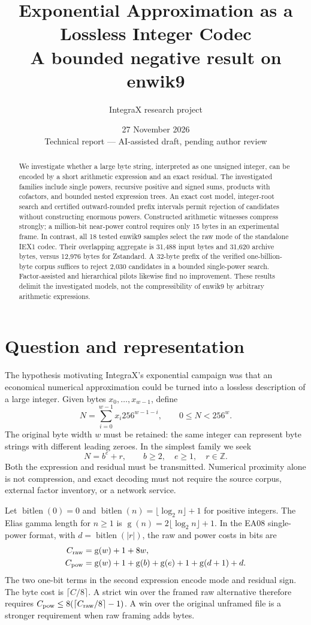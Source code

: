 \documentclass[11pt,a4paper]{article}
\title{Exponential Approximation as a Lossless Integer Codec\\\large A bounded negative result on enwik9}
\author{IntegraX research project}
\date{27 November 2026\\\small Technical report --- AI-assisted draft, pending author review}
\newcommand{\bits}{\operatorname{bitlen}}
\newcommand{\gam}{\operatorname{g}}
\begin{document}
\maketitle
\begin{abstract}
We investigate whether a large byte string, interpreted as one unsigned integer, can be encoded by a short arithmetic expression and an exact residual. The investigated families include single powers, recursive positive and signed sums, products with cofactors, and bounded nested expression trees. An exact cost model, integer-root search and certified outward-rounded prefix intervals permit rejection of candidates without constructing enormous powers. Constructed arithmetic witnesses compress strongly; a million-bit near-power control requires only 15 bytes in an experimental frame. In contrast, all 18 tested enwik9 samples select the raw mode of the standalone IEX1 codec. Their overlapping aggregate is 31,488 input bytes and 31,620 archive bytes, versus 12,976 bytes for Zstandard. A 32-byte prefix of the verified one-billion-byte corpus suffices to reject 2,030 candidates in a bounded single-power search. Factor-assisted and hierarchical pilots likewise find no improvement. These results delimit the investigated models, not the compressibility of enwik9 by arbitrary arithmetic expressions.
\end{abstract}

\section{Question and representation}
The hypothesis motivating IntegraX's exponential campaign was that an economical numerical approximation could be turned into a lossless description of a large integer. Given bytes $x_0,\ldots,x_{w-1}$, define
\[
 N=\sum_{i=0}^{w-1}x_i256^{w-1-i},\qquad 0\le N<256^w.
\]
The original byte width $w$ must be retained: the same integer can represent byte strings with different leading zeroes. In the simplest family we seek
\begin{equation}
 N=b^e+r,\qquad b\ge2,\quad e\ge1,\quad r\in\mathbb Z.
 \label{eq:power}
\end{equation}
Both the expression and residual must be transmitted. Numerical proximity alone is not compression, and exact decoding must not require the source corpus, external factor inventory, or a network service.

Let $\bits(0)=0$ and $\bits(n)=\lfloor\log_2 n\rfloor+1$ for positive integers. The Elias gamma length for $n\ge1$ is $\gam(n)=2\lfloor\log_2n\rfloor+1$. In the EA08 single-power format, with $d=\bits(|r|)$, the raw and power costs in bits are
\begin{align}
 C_{\rm raw}&=\gam(w)+1+8w,\\
 C_{\rm pow}&=\gam(w)+1+\gam(b)+\gam(e)+1+\gam(d+1)+d.
 \label{eq:cost}
\end{align}
The two one-bit terms in the second expression encode mode and residual sign. The byte cost is $\lceil C/8\rceil$. A strict win over the framed raw alternative therefore requires $C_{\rm pow}\le 8(\lceil C_{\rm raw}/8\rceil-1)$. A win over the original unframed file is a stronger requirement when raw framing adds bytes.
\end{document}
